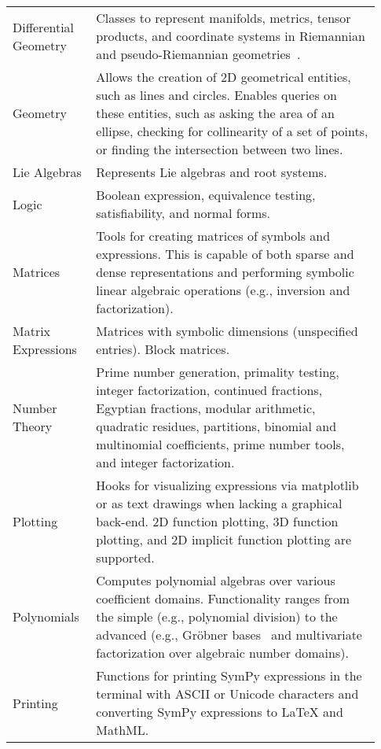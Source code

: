 \begin{longtable}[htbc]{p{0.20\linewidth}p{0.73\linewidth}}
Differential Geometry & Classes to represent manifolds, metrics, tensor
products, and coordinate systems in Riemannian and pseudo-Riemannian
geometries~\cite{FunctionalDifferentialGeometry}.\\

Geometry & Allows the creation of 2D geometrical entities, such as lines and
circles. Enables queries on these entities, such as asking the area of an
ellipse, checking for collinearity of a set of
points, or finding the intersection between two lines.\\

Lie Algebras & Represents Lie algebras and root systems.\\

Logic & Boolean expression, equivalence testing, satisfiability, and normal
forms.\\

Matrices & Tools for creating matrices of symbols and expressions. This is
capable of both sparse and dense representations and performing
symbolic linear algebraic operations (e.g., inversion and factorization).\\

Matrix Expressions & Matrices with symbolic dimensions (unspecified entries).
Block matrices.\\

Number Theory & Prime number generation, primality testing, integer
factorization, continued fractions, Egyptian fractions, modular arithmetic,
quadratic residues, partitions, binomial and multinomial coefficients,
prime number tools, and integer factorization. \\

Plotting & Hooks for visualizing expressions via matplotlib~\cite{Hunter:2007}
or as text drawings when lacking a graphical back-end. 2D function plotting,
3D function
plotting, and 2D implicit function plotting are supported.\\

Polynomials & Computes polynomial algebras over various coefficient domains.
Functionality ranges from the simple (e.g., polynomial division) to the
advanced (e.g., Gr\"obner bases~\cite{adams1994introduction} and multivariate
factorization over algebraic number domains).\\

Printing & Functions for printing SymPy expressions in the terminal with ASCII
or Unicode characters and converting SymPy expressions to \LaTeX{} and
MathML.\\


\end{longtable}
